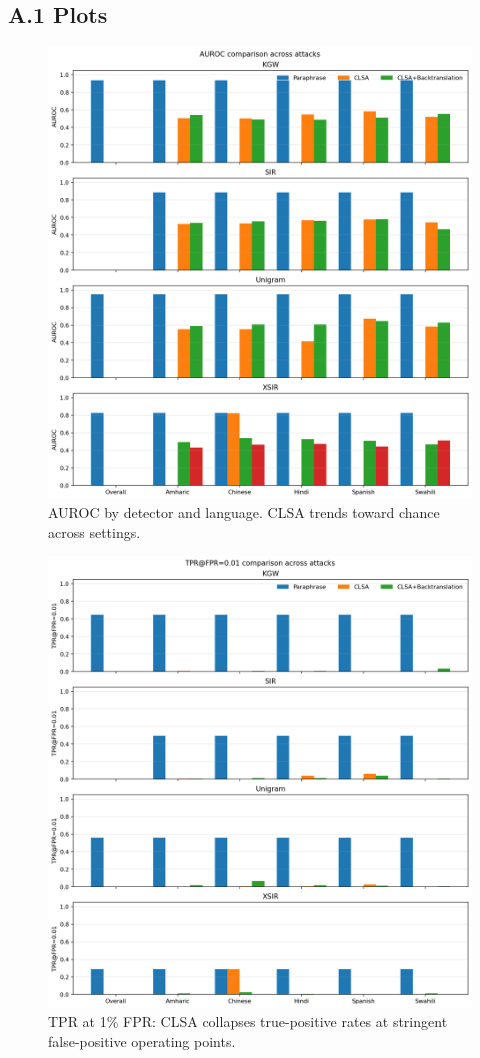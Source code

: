 \documentclass{article}
\begin{document}
\subsection*{A.1 Plots}
\begin{figure}[h]
\centering
\includegraphics[width=\linewidth]{auroc_bars.png}
\caption{AUROC by detector and language. CLSA trends toward chance across settings.}
\end{figure}
%
\begin{figure}[h]
\centering
\includegraphics[width=\linewidth]{tpr_fpr_0_01_bars.png}
\caption{TPR at 1\% FPR: CLSA collapses true-positive rates at stringent false-positive operating points.}
\end{figure}
\end{document}
